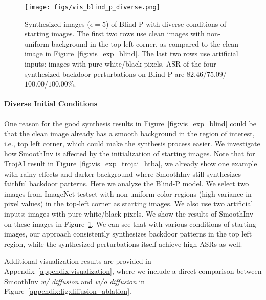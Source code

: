 \documentclass[10pt,twocolumn,letterpaper]{article}
\begin{document}
\begin{figure}[t!]
\centering 
        \begin{minipage}[]{1.0\linewidth}
        {\texttt{[image: figs/vis\_blind\_p\_diverse.png]}}
        \end{minipage}
    \caption{Synthesized images ($\epsilon=5$) of Blind-P with diverse conditions of starting images. The first two rows use clean images with non-uniform background in the top left corner, as compared  to the clean image in Figure~\ref{fig:vis_exp_blind}. The last two rows use artificial inputs: images with pure white/black pixels. ASR of the four synthesized backdoor perturbations on Blind-P are $82.46$/$75.09$/$100.00$/$100.00\%$.}
    \label{fig:vis_blind_p_diverse}
\end{figure}


\paragraph{Diverse Initial Conditions} 
One reason for the good synthesis results in Figure~\ref{fig:vis_exp_blind} could be that the clean image already has a smooth background in the region of interest, i.e., top left corner, which could make the synthesis process easier. We investigate how SmoothInv is affected by the initialization of starting images. Note that for TrojAI result in Figure~\ref{fig:vis_exp_trojai_htba}, we already show one example with rainy effects and darker background where SmoothInv still synthesizes faithful backdoor patterns. Here we analyze the Blind-P model. We select two images from ImageNet testset with non-uniform color regions (high variance in pixel values) in the top-left corner as starting images. We also use two artificial inputs: images with pure white/black pixels. We show the results of SmoothInv on these images in Figure~\ref{fig:vis_blind_p_diverse}. We can see that with various conditions of starting images, our approach consistently synthesizes backdoor patterns in the top left region, while the synthesized perturbations itself achieve high ASRs as well.

Additional visualization results are provided in Appendix~\ref{appendix:visualization}, where we include a direct comparison between SmoothInv \textit{w/ diffusion} and \textit{w/o diffusion} in Figure~\ref{appendix:fig:diffusion_ablation}.
\end{document}
